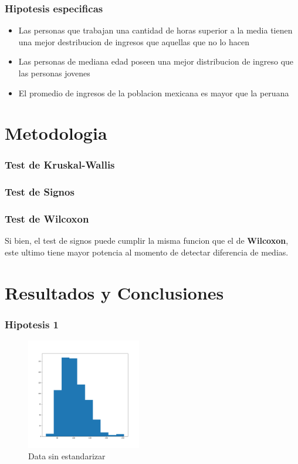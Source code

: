 \documentclass{beamer}
\begin{document}

\begin{frame}
\frametitle{Hipotesis especificas}
  \begin{itemize}
      \item Las personas que trabajan una cantidad de horas superior a
        la media tienen una mejor destribucion de ingresos que aquellas
        que no lo hacen
      \item Las personas de mediana edad poseen una mejor distribucion
        de ingreso que las personas jovenes
      \item El promedio de ingresos de la poblacion mexicana es mayor
        que la peruana
  \end{itemize}

\end{frame}

\section{Metodologia}

\begin{frame}
  \frametitle{Test de Kruskal-Wallis}


\end{frame}


\begin{frame}
  \frametitle{Test de Signos}


\end{frame}

\begin{frame}
  \frametitle{Test de Wilcoxon}

  Si bien, el test de signos puede cumplir la misma funcion que el de
  \textbf{Wilcoxon}, este ultimo tiene mayor potencia al momento de
  detectar diferencia de medias.


\end{frame}



\section{Resultados y Conclusiones}

\begin{frame}
  \frametitle{Hipotesis 1}
  \begin{figure}[t]
    \caption{Data sin estandarizar}
    \includegraphics[width=5cm]{Figure_1.png}
  \end{figure}

\end{frame}
\end{document}
